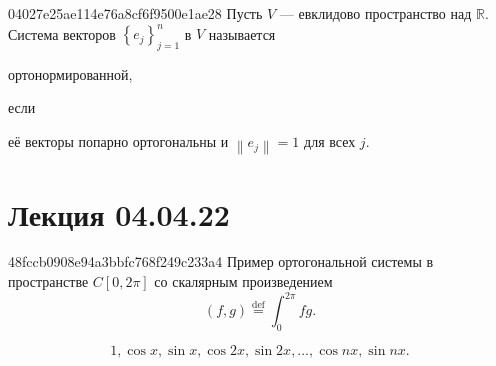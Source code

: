 \begin{note}{04027e25ae114e76a8cf6f9500e1ae28}
    Пусть \({ V }\) --- евклидово пространство над \({ \mathbb R }\).
    Система векторов \({ \left\{ e_j \right\}_{j = 1}^{n} }\) в \({ V }\) называется \begin{icloze}{2}ортонормированной,\end{icloze} если \begin{icloze}{1}её векторы попарно ортогональны и \({ \left\lVert e_j \right\rVert = 1 }\) для всех \({ j }\).\end{icloze}
\end{note}

\section{Лекция 04.04.22}
\begin{note}{48fccb0908e94a3bbfc768f249c233a4}
    Пример ортогональной системы в пространстве \({ C[0, 2\pi] }\) со скалярным произведением
    \[
        (f, g) \overset{\text{def}}= \int_{0}^{2\pi} f g.
    \]

    \begin{cloze}{1}
        \[
            1, \cos x, \sin x, \cos 2x, \sin 2x, \ldots, \cos nx, \sin nx.
        \]
    \end{cloze}
\end{note}


